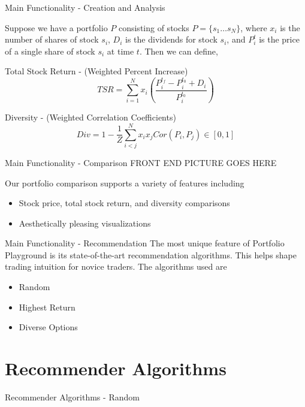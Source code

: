 \documentclass{beamer}
\begin{document}
\begin{frame}{Main Functionality - Creation and Analysis}

Suppose we have a portfolio $P$ consisting of stocks $P = \{s_1\dots s_N\}$, where $x_i$ is the number of shares of stock $s_i$, $D_i$ is the dividends for stock $s_i$, and $P^{t}_{i}$ is the price of a single share of stock $s_i$ at time $t$. Then we can define,

\begin{block}{Total Stock Return - (Weighted Percent Increase)}
$$TSR = \sum_{i=1}^N x_i \left( \frac{P^{t_f}_{i} - P^{t_0}_{i} + D_i}{P^{t_0}_{i}} \right) $$
\end{block}

\begin{block}{Diversity - (Weighted Correlation Coefficients)}
$$Div = 1 - \frac{1}{Z} \sum_{i<j}^N x_i x_j Cor(P_i,P_j) \in \left[ 0,1 \right]$$ 
\end{block}

\end{frame}

\begin{frame}{Main Functionality - Comparison}
FRONT END PICTURE GOES HERE

Our portfolio comparison supports a variety of features including
	\begin{itemize}
		\item Stock price, total stock return, and diversity comparisons
		\item Aesthetically pleasing visualizations
	\end{itemize}

\end{frame}

\begin{frame}{Main Functionality - Recommendation}
The most unique feature of Portfolio Playground is its state-of-the-art recommendation algorithms. This helps shape trading intuition for novice traders. The algorithms used are

\begin{itemize}
\item Random
\item Highest Return
\item Diverse Options
\end{itemize}

\end{frame}

\section{Recommender Algorithms}
\begin{frame}{Recommender Algorithms - Random}

\end{frame}
\end{document}
